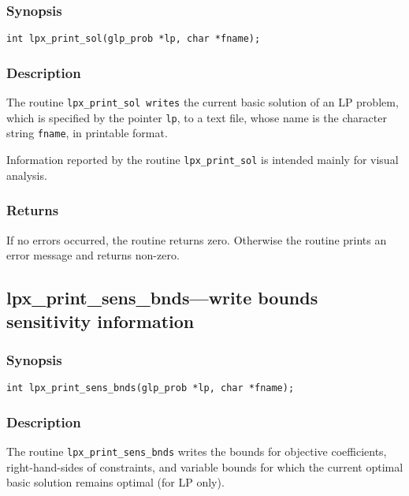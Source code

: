 \subsubsection*{Synopsis}

\begin{verbatim}
int lpx_print_sol(glp_prob *lp, char *fname);
\end{verbatim}

\subsubsection*{Description}

The routine \verb|lpx_print_sol writes| the current basic solution of
an LP problem, which is specified by the pointer \verb|lp|, to a text
file, whose name is the character string \verb|fname|, in printable
format.

Information reported by the routine \verb|lpx_print_sol| is intended
mainly for visual analysis.

\subsubsection*{Returns}

If no errors occurred, the routine returns zero. Otherwise the routine
prints an error message and returns non-zero.

\subsection{lpx\_print\_sens\_bnds---write bounds sensitivity
information}

\subsubsection*{Synopsis}

\begin{verbatim}
int lpx_print_sens_bnds(glp_prob *lp, char *fname);
\end{verbatim}

\subsubsection*{Description}

The routine \verb|lpx_print_sens_bnds| writes the bounds for objective
coefficients, right-hand-sides of constraints, and variable bounds
for which the current optimal basic solution remains optimal (for LP
only).

